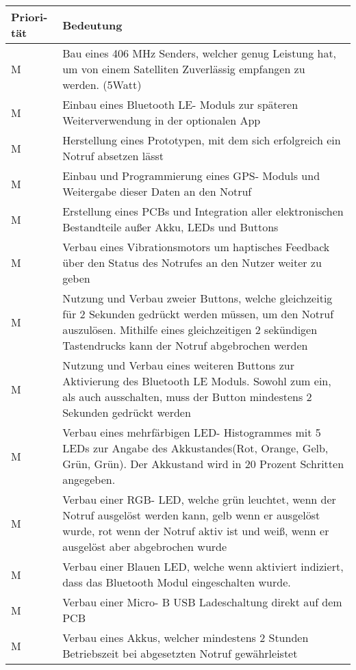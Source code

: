 \begin{tabular}{| p{1.5cm} | p{13.5cm} |}
	
	\hline
	\textbf{Priori-} \newline \textbf{tät} & 
	\textbf{Bedeutung} \\
	\hline
	
	M & 
	Bau eines 406 MHz Senders, welcher genug Leistung hat, um von einem Satelliten Zuverlässig empfangen zu werden. (5Watt) \\
	\hline
	
	M &
	Einbau eines Bluetooth LE- Moduls zur späteren Weiterverwendung in der optionalen App \\
	\hline
	
	M &
	Herstellung eines Prototypen, mit dem sich erfolgreich ein Notruf absetzen lässt  \\
	\hline
	
	M &
    Einbau und Programmierung eines GPS- Moduls und Weitergabe dieser Daten an den Notruf  \\
	\hline
	
	M &
	Erstellung eines PCBs und Integration aller elektronischen Bestandteile außer Akku, LEDs und Buttons  \\
	\hline
	
	M &
	Verbau eines Vibrationsmotors um haptisches Feedback über den Status des Notrufes an den Nutzer weiter zu geben  \\
	\hline
	
	M &
	Nutzung und Verbau zweier Buttons, welche gleichzeitig für 2 Sekunden gedrückt werden müssen, um den Notruf auszulösen. Mithilfe eines gleichzeitigen 2 sekündigen Tastendrucks kann der Notruf abgebrochen werden \\
	\hline
	
	M &
	Nutzung und Verbau eines weiteren Buttons zur Aktivierung des Bluetooth LE Moduls. Sowohl zum ein, als auch ausschalten, muss der Button mindestens 2 Sekunden gedrückt werden \\
	\hline
	
	M &
	Verbau eines mehrfärbigen LED- Histogrammes mit 5 LEDs zur Angabe des Akkustandes(Rot, Orange, Gelb, Grün, Grün). Der Akkustand wird in 20 Prozent Schritten angegeben. \\
	\hline
	
	M & 
	Verbau einer RGB- LED, welche grün leuchtet, wenn der Notruf ausgelöst werden kann, gelb wenn er ausgelöst wurde, rot wenn der Notruf aktiv ist und weiß, wenn er ausgelöst aber abgebrochen wurde \\
	\hline
	
	M & 
	Verbau einer Blauen LED, welche wenn aktiviert indiziert, dass das Bluetooth Modul eingeschalten wurde.\\
	\hline
	
	M & 
	Verbau einer Micro- B USB Ladeschaltung direkt auf dem PCB\\
	\hline
	
	M & 
	Verbau eines Akkus, welcher mindestens 2 Stunden Betriebszeit bei abgesetzten Notruf gewährleistet\\
	\hline
\end{tabular}
